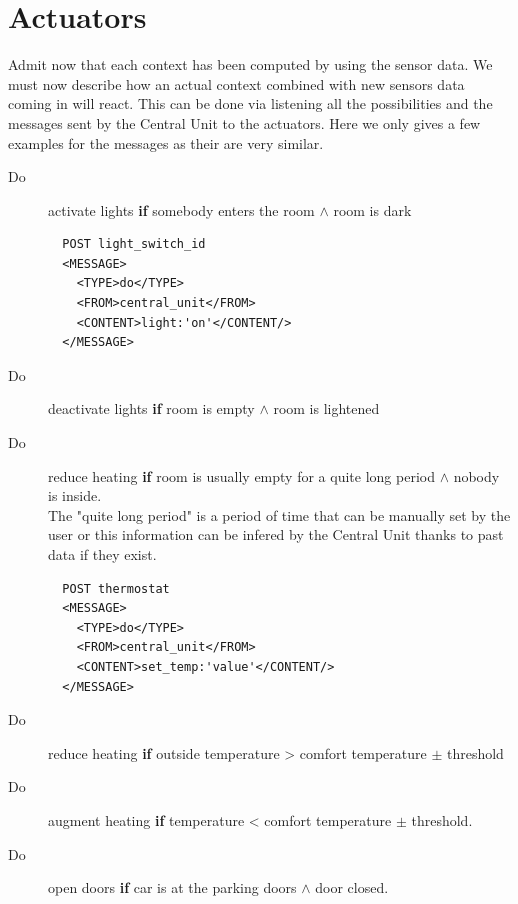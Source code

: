\documentclass{acm_proc_article-sp}
\begin{document}
\section{Actuators}
Admit now that each context has been computed by using the sensor data.
We must now describe how an actual context combined with new sensors data coming in will react. 
This can be done via listening all the possibilities and the messages sent by the Central Unit to the actuators.
Here we only gives a few examples for the messages as their are very similar.
\begin{description}
 \item[Do] activate lights \textbf{if} somebody enters the room $\land$ room is dark\\
 \begin{verbatim}
  POST light_switch_id 
  <MESSAGE>
    <TYPE>do</TYPE>
    <FROM>central_unit</FROM>
    <CONTENT>light:'on'</CONTENT/>
  </MESSAGE> 
\end{verbatim}
 \item[Do] deactivate lights \textbf{if} room is empty $\land$ room is lightened
 \item[Do] reduce heating \textbf{if} room is usually empty for a quite long period $\land$ nobody is inside.\\
 The "quite long period" is a period of time that can be manually set by the user or this information can be infered by the Central Unit thanks to past data if they exist.
 \begin{verbatim}
  POST thermostat 
  <MESSAGE>
    <TYPE>do</TYPE>
    <FROM>central_unit</FROM>
    <CONTENT>set_temp:'value'</CONTENT/>
  </MESSAGE> 
\end{verbatim}
 \item[Do] reduce heating \textbf{if} outside temperature > comfort temperature $\pm$ threshold
 \item[Do] augment heating \textbf{if} temperature < comfort temperature $\pm$ threshold.
 \item[Do] open doors \textbf{if} car is at the parking doors $\land$ door closed.

\end{description}
\end{document}
